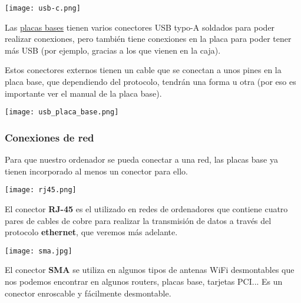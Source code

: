 \vspace{-15pt}
\begin{center}
    \texttt{[image: usb-c.png]}
    \vspace{-10pt}
\end{center}

Las \hyperlink{placa_base}{placas bases} tienen varios conectores USB typo-A soldados para poder realizar conexiones, pero también tiene conexiones en la placa para poder tener más USB (por ejemplo, gracias a los que vienen en la caja).

Estos conectores externos tienen un cable que se conectan a unos pines en la placa base, que dependiendo del protocolo, tendrán una forma u otra (por eso es importante ver el manual de la placa base).

\vspace{-10pt}
\begin{center}
    \texttt{[image: usb\_placa\_base.png]}
    \vspace{-10pt}
\end{center}


\subsubsection{Conexiones de red}

Para que nuestro ordenador se pueda conectar a una red, las placas base ya tienen incorporado al menos un conector para ello.

\begin{minipage}{0.15\linewidth}
    \texttt{[image: rj45.png]}
\end{minipage}
\hfill
\begin{minipage}{0.8\linewidth}
    El conector \textbf{RJ-45} es el utilizado en redes de ordenadores que contiene cuatro pares de cables de cobre para realizar la transmisión de datos a través del protocolo \textbf{ethernet}, que veremos más adelante.
\end{minipage}


\vspace{12pt}
\begin{minipage}{0.15\linewidth}
    \texttt{[image: sma.jpg]}
\end{minipage}
\hfill
\begin{minipage}{0.8\linewidth}
    El conector \textbf{SMA} se utiliza en algunos tipos de antenas WiFi desmontables que nos podemos encontrar en algunos routers, placas base, tarjetas PCI... Es un conector enroscable y fácilmente desmontable.
\end{minipage}


